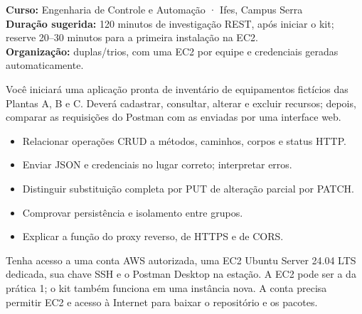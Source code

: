 
\newcommand{\docshort}{Prática 2 · API REST, Postman e interface web}

\textbf{Curso:} Engenharia de Controle e Automação · Ifes, Campus Serra\\
\textbf{Duração sugerida:} 120 minutos de investigação REST, após iniciar o kit; reserve 20--30 minutos para a primeira instalação na EC2.\\
\textbf{Organização:} duplas/trios, com uma EC2 por equipe e credenciais geradas automaticamente.

Você iniciará uma aplicação pronta de inventário de equipamentos fictícios das Plantas A, B e C. Deverá cadastrar, consultar, alterar e excluir recursos; depois, comparar as requisições do Postman com as enviadas por uma interface web.


\begin{itemize}
\item Relacionar operações CRUD a métodos, caminhos, corpos e status HTTP.
\item Enviar JSON e credenciais no lugar correto; interpretar erros.
\item Distinguir substituição completa por PUT de alteração parcial por PATCH.
\item Comprovar persistência e isolamento entre grupos.
\item Explicar a função do proxy reverso, de HTTPS e de CORS.
\end{itemize}

Tenha acesso a uma conta AWS autorizada, uma EC2 Ubuntu Server 24.04 LTS dedicada, sua chave SSH e o Postman Desktop na estação. A EC2 pode ser a da prática 1; o kit também funciona em uma instância nova. A conta precisa permitir EC2 e acesso à Internet para baixar o repositório e os pacotes.

